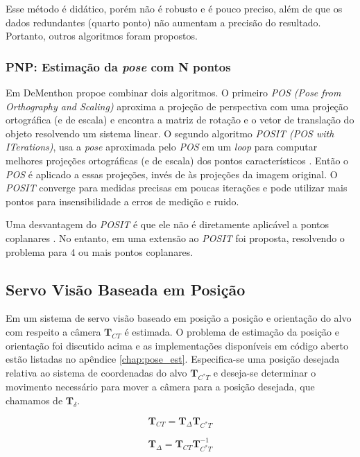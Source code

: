 Esse método é didático, porém não é robusto e é pouco preciso, além de que os dados redundantes (quarto ponto) não aumentam a precisão do resultado. Portanto, outros algoritmos foram propostos.

\subsubsection{PNP: Estimação da \textit{pose} com N pontos}
Em \cite{dementhon1995model} DeMenthon propoe combinar dois algoritmos. O primeiro \textit{POS (Pose from Orthography and Scaling)} aproxima a projeção de perspectiva com uma projeção ortográfica (e de escala) e encontra a matriz de rotação e o vetor de translação do objeto resolvendo um sistema linear. O segundo algoritmo \textit{POSIT (POS with ITerations)}, usa a \textit{pose} aproximada pelo \textit{POS} em um \textit{loop} para computar melhores projeções ortográficas (e de escala) dos pontos característicos \cite{note}. Então o \textit{POS} é aplicado a essas projeções, invés de às projeções da imagem original. O \textit{POSIT} converge para medidas precisas em poucas iterações e pode utilizar mais pontos para insensibilidade a erros de medição e ruido. 

Uma desvantagem do \textit{POSIT} é que ele não é diretamente aplicável a pontos coplanares \cite{marchand2016pose}. No entanto, em \cite{oberkampf1996iterative} uma extensão ao \textit{POSIT} foi proposta, resolvendo o problema para 4 ou mais pontos coplanares. 


\subsection{Servo Visão Baseada em Posição}
Em um sistema de servo visão baseado em posição a posição e orientação do alvo com respeito a câmera $\bm{T}_{CT}$ é estimada. O problema de estimação da posição e orientação foi discutido acima e as implementações disponíveis em código aberto estão listadas no apêndice \ref{chap:pose_est}.
Especifica-se uma posição desejada relativa ao sistema de coordenadas do alvo  $\bm{T}_{C^*T}$ e deseja-se determinar o movimento necessário para mover a câmera para a posição desejada, que chamamos de $\bm{T}_\delta$.

\begin{equation}
 \bm{T}_{CT} =  \bm{T}_\Delta \bm{T}_{C^*T}
\end{equation}

\begin{equation}
 \bm{T}_\Delta  =   \bm{T}_{CT} \bm{T}_{C^*T}^{-1}
\end{equation}